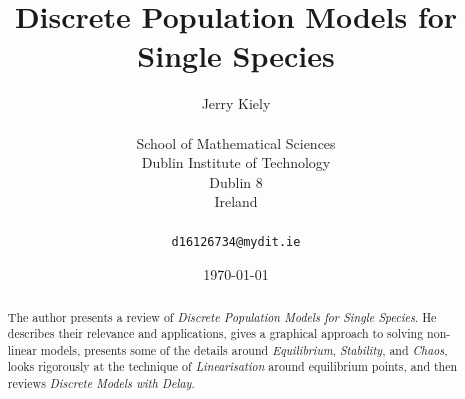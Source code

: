 \documentclass{report}
\begin{document}
\title{Discrete Population Models for Single Species}
\author{Jerry Kiely\\
	\\
	School of Mathematical Sciences\\
	Dublin Institute of Technology\\
	Dublin 8\\
	Ireland\\
	\\
	\texttt{d16126734@mydit.ie}}
\date{\today}
\maketitle


\tableofcontents

\newpage

\begin{minipage}[b]{1\linewidth}
    \listoffigures
\end{minipage}

\begin{minipage}[b]{1\linewidth}
    \listoftables
\end{minipage}


\newpage










\begin{abstract}
The author presents a review of \emph{Discrete Population Models for Single Species}. He
describes their relevance and applications, gives a graphical approach to solving non-linear
models, presents some of the details around \emph{Equilibrium}, \emph{Stability}, and
\emph{Chaos}, looks rigorously at the technique of \emph{Linearisation} around equilibrium
points, and then reviews \emph{Discrete Models with Delay}.
\end{abstract}
\end{document}
